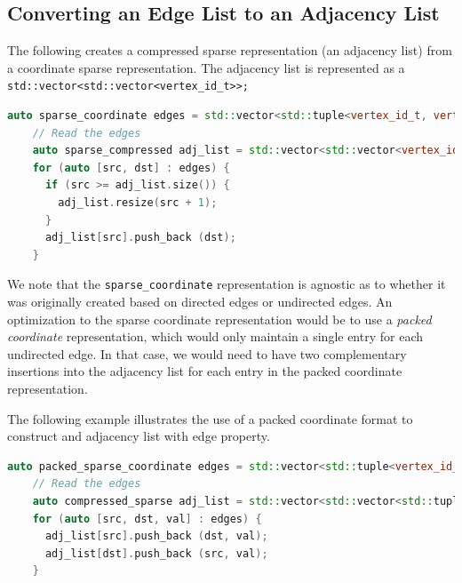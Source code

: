 \subsection{Converting an Edge List to an Adjacency List}

The following creates a compressed sparse representation (an adjacency list) from a coordinate sparse representation.  The adjacency list is represented as 
a \lstinline{std::vector<std::vector<vertex_id_t>>;}
\begin{lstlisting}[language=C++]
    auto sparse_coordinate edges = std::vector<std::tuple<vertex_id_t, vertex_id_t>;
    // Read the edges
    auto sparse_compressed adj_list = std::vector<std::vector<vertex_id_t>>;
    for (auto [src, dst] : edges) {
      if (src >= adj_list.size()) {
        adj_list.resize(src + 1);
      }
      adj_list[src].push_back (dst);
    }
\end{lstlisting}

We note that the \lstinline{sparse_coordinate} representation is agnostic as to whether it was originally created based on directed edges or undirected edges.  An optimization to the sparse coordinate representation would be to use a \emph{packed coordinate} representation, which would only maintain a single entry for each undirected edge.  In that case, we would need to have two complementary insertions into the adjacency list for each entry in the packed coordinate representation.

The following example illustrates the use of a packed coordinate format to construct and adjacency list with edge property.
\begin{lstlisting}[language=C++]
    auto packed_sparse_coordinate edges = std::vector<std::tuple<vertex_id_t, vertex_id_t, double>;
    // Read the edges
    auto compressed_sparse adj_list = std::vector<std::vector<std::tuple<vertex_id_t, double>>>(edges.num_vertices();
    for (auto [src, dst, val] : edges) {
      adj_list[src].push_back (dst, val);
      adj_list[dst].push_back (src, val);
    }
 \end{lstlisting}





